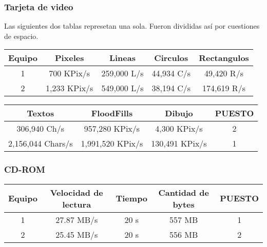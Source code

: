 \subsubsection{Tarjeta de video}
Las siguientes dos tablas represetan una sola. Fueron divididas así por cuestiones de espacio.
\vspace{10px}

\begin{center}
\begin{tabular}{|ccccc|} \hline
\footnotesize\textbf{Equipo} & \footnotesize\textbf{Pixeles} & \footnotesize\textbf{Lineas} & \footnotesize\textbf{Circulos} & \footnotesize\textbf{Rectangulos} \\\hline
1 & 700 KPix/s & 259,000 L/s & 44,934 C/s & 49,420 R/s \\\hline
2 & 1,233 KPix/s & 549,000 L/s & 38,194 C/s & 174,619 R/s \\\hline
\end{tabular}
\end{center}
\vspace{10px}

\begin{center}
\begin{tabular}{|cccc|} \hline
\footnotesize\textbf{Textos} & \footnotesize\textbf{FloodFills} & \footnotesize\textbf{Dibujo} & \footnotesize\textbf{PUESTO} \\\hline
306,940 Ch/s & 957,280 KPix/s & 4,300 KPix/s & 2 \\\hline
2,156,044 Chars/s & 1,991,520 KPix/s & 130,491 KPix/s & 1 \\\hline
\end{tabular}
\end{center}

\subsubsection{CD-ROM}
\begin{center}
\begin{tabular}{|ccccc|} \hline
\footnotesize\textbf{Equipo} & \footnotesize\textbf{Velocidad de lectura} & \footnotesize\textbf{Tiempo} & \footnotesize\textbf{Cantidad de bytes} & \footnotesize\textbf{PUESTO} \\\hline
1 & 27.87 MB/s & 20 s & 557 MB & 1 \\\hline
2 & 25.45 MB/s & 20 s & 556 MB & 2 \\\hline
\end{tabular}
\end{center}

